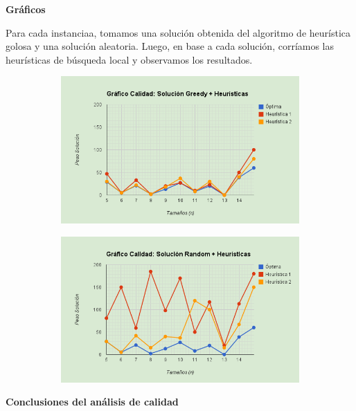 \documentclass[10pt,a4paper]{article}
\begin{document}
\textbf{Gráficos}

Para cada instanciaa, tomamos una solución obtenida del algoritmo de heurística golosa y una solución aleatoria. Luego, en base a cada solución, corríamos las heurísticas de búsqueda local y observamos los resultados.

\begin{figure}[h]
        \begin{subfigure}[b]{0.5\textwidth}
                \includegraphics[width=\textwidth]{grafico_calidad_greedy_heurisitcas.png}
        \end{subfigure}
        \begin{subfigure}[b]{0.5\textwidth}
                \includegraphics[width=\textwidth]{grafico_calidad_random_heurisitcas.png}
        \end{subfigure}
\end{figure}

\textbf{Conclusiones del análisis de calidad}
\end{document}
